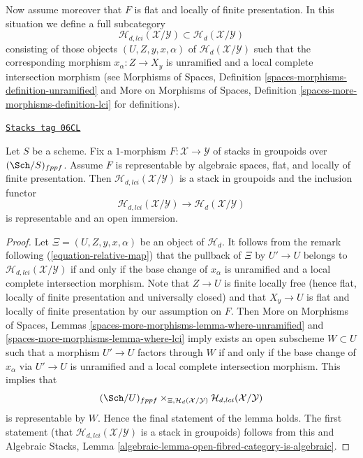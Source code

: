 \medskip\noindent
Now assume moreover that $F$ is flat and locally of finite presentation.
In this situation we define a full subcategory
$$
\mathcal{H}_{d, lci}(\mathcal{X}/\mathcal{Y}) \subset
\mathcal{H}_d(\mathcal{X}/\mathcal{Y})
$$
consisting of those objects $(U, Z, y, x, \alpha)$ of
$\mathcal{H}_d(\mathcal{X}/\mathcal{Y})$ such
that the corresponding morphism $x_\alpha : Z \to X_y$ is unramified
and a local complete intersection morphism (see
Morphisms of Spaces, Definition \ref{spaces-morphisms-definition-unramified}
and
More on Morphisms of Spaces,
Definition \ref{spaces-more-morphisms-definition-lci}
for definitions).

\begin{lemma}
\label{criteria-lemma-lci-locus-stack-in-groupoids}
\href{https://stacks.math.columbia.edu/tag/06CL}{\texttt{Stacks tag 06CL}}

Let $S$ be a scheme. Fix a $1$-morphism
$F : \mathcal{X} \longrightarrow \mathcal{Y}$
of stacks in groupoids over $(\Sch/S)_{fppf}$.
Assume $F$ is representable by algebraic spaces, flat, and locally
of finite presentation. Then $\mathcal{H}_{d, lci}(\mathcal{X}/\mathcal{Y})$
is a stack in groupoids and the inclusion functor
$$
\mathcal{H}_{d, lci}(\mathcal{X}/\mathcal{Y})
\longrightarrow
\mathcal{H}_d(\mathcal{X}/\mathcal{Y})
$$
is representable and an open immersion.
\end{lemma}

\begin{proof}
Let $\Xi = (U, Z, y, x, \alpha)$ be an object of $\mathcal{H}_d$. It follows
from the remark following
(\ref{equation-relative-map})
that the pullback of $\Xi$ by $U' \to U$ belongs to
$\mathcal{H}_{d, lci}(\mathcal{X}/\mathcal{Y})$ if and only if the base
change of $x_\alpha$ is unramified and a local complete intersection morphism.
Note that $Z \to U$ is finite locally free (hence flat, locally of
finite presentation and universally closed) and that $X_y \to U$ is
flat and locally of finite presentation by our assumption on $F$. Then
More on Morphisms of Spaces, Lemmas
\ref{spaces-more-morphisms-lemma-where-unramified} and
\ref{spaces-more-morphisms-lemma-where-lci}
imply exists an open subscheme $W \subset U$ such that a morphism
$U' \to U$ factors through $W$ if and only if the base change of
$x_\alpha$ via $U' \to U$ is unramified and a local complete intersection
morphism. This implies that
$$
(\Sch/U)_{fppf}
\times_{\Xi, \mathcal{H}_d(\mathcal{X}/\mathcal{Y})}
\mathcal{H}_{d, lci}(\mathcal{X}/\mathcal{Y})
$$
is representable by $W$. Hence the final statement of the lemma
holds. The first statement (that
$\mathcal{H}_{d, lci}(\mathcal{X}/\mathcal{Y})$ is a stack in groupoids)
follows from this and
Algebraic Stacks,
Lemma \ref{algebraic-lemma-open-fibred-category-is-algebraic}.
\end{proof}

